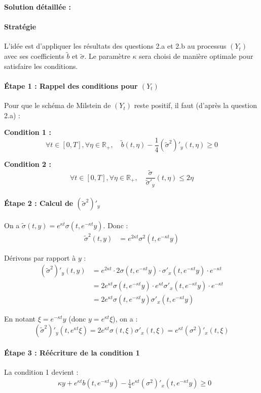 \documentclass[12pt,a4paper]{article}
\theoremstyle{definition}
\theoremstyle{remark}
\newcommand{\R}{\mathbb{R}}
\begin{document}
\textbf{Solution détaillée :}

\paragraph{Stratégie}
L'idée est d'appliquer les résultats des questions 2.a et 2.b au processus $(Y_t)$ avec ses coefficients $\tilde{b}$ et $\tilde{\sigma}$. Le paramètre $\kappa$ sera choisi de manière optimale pour satisfaire les conditions.

\paragraph{Étape 1 : Rappel des conditions pour $(Y_t)$}
Pour que le schéma de Milstein de $(Y_t)$ reste positif, il faut (d'après la question 2.a) :

\textbf{Condition 1 :}
\[
\forall t \in [0,T], \forall \eta \in \R_+, \quad \tilde{b}(t,\eta) - \frac{1}{4}(\tilde{\sigma}^2)'_y(t,\eta) \geq 0
\]

\textbf{Condition 2 :}
\[
\forall t \in [0,T], \forall \eta \in \R_+, \quad \frac{\tilde{\sigma}}{\tilde{\sigma}'_y}(t,\eta) \leq 2\eta
\]

\paragraph{Étape 2 : Calcul de $(\tilde{\sigma}^2)'_y$}
On a $\tilde{\sigma}(t,y) = e^{\kappa t}\sigma(t, e^{-\kappa t}y)$. Donc :
\begin{align*}
\tilde{\sigma}^2(t,y) &= e^{2\kappa t}\sigma^2(t, e^{-\kappa t}y)
\end{align*}

Dérivons par rapport à $y$ :
\begin{align*}
(\tilde{\sigma}^2)'_y(t,y) &= e^{2\kappa t} \cdot 2\sigma(t, e^{-\kappa t}y) \cdot \sigma'_x(t, e^{-\kappa t}y) \cdot e^{-\kappa t} \\
&= 2e^{\kappa t}\sigma(t, e^{-\kappa t}y) \cdot e^{\kappa t}\sigma'_x(t, e^{-\kappa t}y) \cdot e^{-\kappa t} \\
&= 2e^{\kappa t}\sigma(t, e^{-\kappa t}y)\sigma'_x(t, e^{-\kappa t}y)
\end{align*}

En notant $\xi = e^{-\kappa t}y$ (donc $y = e^{\kappa t}\xi$), on a :
\[
(\tilde{\sigma}^2)'_y(t, e^{\kappa t}\xi) = 2e^{\kappa t}\sigma(t,\xi)\sigma'_x(t,\xi) = e^{\kappa t}(\sigma^2)'_x(t,\xi)
\]

\paragraph{Étape 3 : Réécriture de la condition 1}
La condition 1 devient :
\begin{align*}
&\kappa y + e^{\kappa t}b(t, e^{-\kappa t}y) - \frac{1}{4}e^{\kappa t}(\sigma^2)'_x(t, e^{-\kappa t}y) \geq 0
\end{align*}
\end{document}
